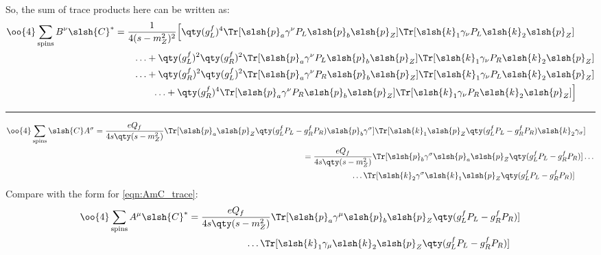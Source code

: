 	So, the sum of trace products here can be written as:
	\begin{align}
		\label{eqn:BnC_result}
		\begin{split}
			\oo{4}\sum_\text{spins}B^\nu\slsh{C}^*
			&=\frac{1}{4(s-m_Z^2)^2}
				\Big[
				\qty(g_L^f)^4
				\Tr[\slsh{p}_a\gamma^\nu P_L\slsh{p}_b\slsh{p}_Z]
				\Tr[\slsh{k}_1\gamma_\nu P_L\slsh{k}_2\slsh{p}_Z]
				\\&\qquad\ldots+
				\qty(g_L^f)^2\qty(g_R^f)^2
				\Tr[\slsh{p}_a\gamma^\nu P_L\slsh{p}_b\slsh{p}_Z]
				\Tr[\slsh{k}_1\gamma_\nu P_R\slsh{k}_2\slsh{p}_Z]
				\\&\qquad\ldots+
				\qty(g_R^f)^2\qty(g_L^f)^2
				\Tr[\slsh{p}_a\gamma^\nu P_R\slsh{p}_b\slsh{p}_Z]
				\Tr[\slsh{k}_1\gamma_\nu P_L\slsh{k}_2\slsh{p}_Z]
				\\&\qquad\qquad\ldots+
				\qty(g_R^f)^4
				\Tr[\slsh{p}_a\gamma^\nu P_R\slsh{p}_b\slsh{p}_Z]
				\Tr[\slsh{k}_1\gamma_\nu P_R\slsh{k}_2\slsh{p}_Z]
				\Big]
		\end{split}
	\end{align}
\hrule\newpage
	\begin{align}
		\begin{split}
			\oo{4}\sum_\text{spins}\slsh{C} A^\sigma
			&=\frac{eQ_f}{4s\qty(s-m_Z^2)}
			\Tr[\slsh{p}_a\slsh{p}_Z\qty(g_L^fP_L-g_R^fP_R)\slsh{p}_b\gamma^\sigma]
			\Tr[\slsh{k}_1\slsh{p}_Z\qty(g_L^fP_L-g_R^fP_R)\slsh{k}_2\gamma_\sigma]
		\end{split}
		\\
		\label{eqn:CAs_trace}
		\begin{split}
			&=\frac{eQ_f}{4s\qty(s-m_Z^2)}
			\Tr[\slsh{p}_b\gamma^\sigma\slsh{p}_a\slsh{p}_Z\qty(g_L^fP_L-g_R^fP_R)]
			\ldots\\&\qquad\qquad\qquad\ldots
			\Tr[\slsh{k}_2\gamma^\sigma\slsh{k}_1\slsh{p}_Z\qty(g_L^fP_L-g_R^fP_R)]
		\end{split}
	\end{align}
	Compare with the form for \ref{eqn:AmC_trace}:
	\begin{align}
		\begin{split}
			\oo{4}\sum_\text{spins}A^\mu \slsh{C}^*
			&=
			\frac{eQ_f}{4s\qty(s-m_Z^2)}
			\Tr[\slsh{p}_a\gamma^\mu \slsh{p}_b\slsh{p}_Z\qty(g_L^fP_L-g_R^fP_R)]
			\\&\qquad\qquad\qquad\ldots
			\Tr[\slsh{k}_1\gamma_\mu \slsh{k}_2\slsh{p}_Z\qty(g_L^fP_L-g_R^fP_R)]
		\end{split}
	\end{align}

